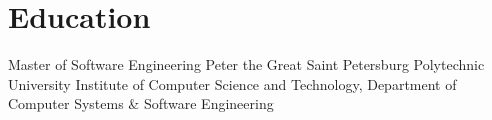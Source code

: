 \documentclass[11pt,a4paper,sans]{moderncv}
\begin{document}






\section{Education}

    {Master of Software Engineering}
    {Peter the Great Saint Petersburg Polytechnic University}
    {Institute of Computer Science and Technology, Department of Computer Systems \& Software Engineering}{}{}
    
\end{document}
